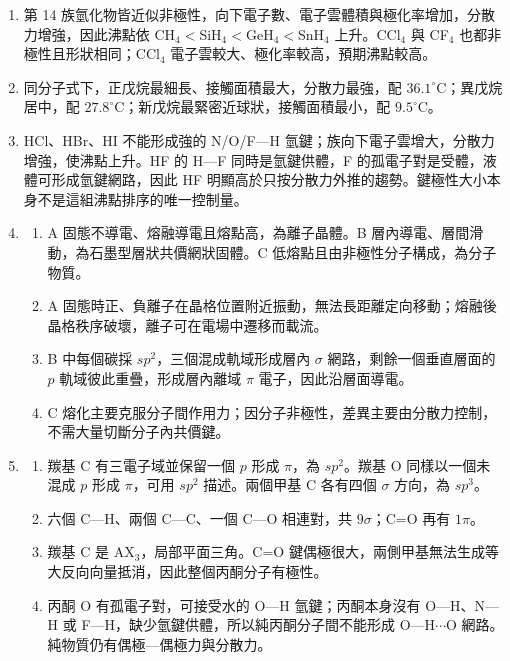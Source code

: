 \documentclass[11pt,a4paper]{article}
\providecommand{\tightlist}{%
  \setlength{\itemsep}{0pt}\setlength{\parskip}{0pt}}
\begin{document}
\begin{enumerate}
  \[
  \mu=\sqrt{(1.20)^2+(1.20)^2}
  =1.20\sqrt2
  =1.70\ \mathrm D.
  \]

  結果小於同向最大值 \(2.40\ \mathrm D\)，大於零，與折線幾何一致。
\item
  第 14 族氫化物皆近似非極性，向下電子數、電子雲體積與極化率增加，分散力增強，因此沸點依 CH\(_4<\)SiH\(_4<\)GeH\(_4<\)SnH\(_4\) 上升。CCl\(_4\) 與 CF\(_4\) 也都非極性且形狀相同；CCl\(_4\) 電子雲較大、極化率較高，預期沸點較高。
\item
  同分子式下，正戊烷最細長、接觸面積最大，分散力最強，配 \(36.1^\circ\mathrm C\)；異戊烷居中，配 \(27.8^\circ\mathrm C\)；新戊烷最緊密近球狀，接觸面積最小，配 \(9.5^\circ\mathrm C\)。
\item
  HCl、HBr、HI 不能形成強的 N/O/F---H 氫鍵；族向下電子雲增大，分散力增強，使沸點上升。HF 的 H---F 同時是氫鍵供體，F 的孤電子對是受體，液體可形成氫鍵網路，因此 HF 明顯高於只按分散力外推的趨勢。鍵極性大小本身不是這組沸點排序的唯一控制量。
\item
  \begin{enumerate}
  \def\labelenumii{\arabic{enumii}.}
  \tightlist
  \item
    A 固態不導電、熔融導電且熔點高，為離子晶體。B 層內導電、層間滑動，為石墨型層狀共價網狀固體。C 低熔點且由非極性分子構成，為分子物質。
  \item
    A 固態時正、負離子在晶格位置附近振動，無法長距離定向移動；熔融後晶格秩序破壞，離子可在電場中遷移而載流。
  \item
    B 中每個碳採 \(sp^2\)，三個混成軌域形成層內 \(\sigma\) 網路，剩餘一個垂直層面的 \(p\) 軌域彼此重疊，形成層內離域 \(\pi\) 電子，因此沿層面導電。
  \item
    C 熔化主要克服分子間作用力；因分子非極性，差異主要由分散力控制，不需大量切斷分子內共價鍵。
  \end{enumerate}
\item
  \begin{enumerate}
  \def\labelenumii{\arabic{enumii}.}
  \tightlist
  \item
    羰基 C 有三電子域並保留一個 \(p\) 形成 \(\pi\)，為 \(sp^2\)。羰基 O 同樣以一個未混成 \(p\) 形成 \(\pi\)，可用 \(sp^2\) 描述。兩個甲基 C 各有四個 \(\sigma\) 方向，為 \(sp^3\)。
  \item
    六個 C---H、兩個 C---C、一個 C---O 相連對，共 \(9\sigma\)；C=O 再有 \(1\pi\)。
  \item
    羰基 C 是 AX\(_3\)，局部平面三角。C=O 鍵偶極很大，兩側甲基無法生成等大反向向量抵消，因此整個丙酮分子有極性。
  \item
    丙酮 O 有孤電子對，可接受水的 O---H 氫鍵；丙酮本身沒有 O---H、N---H 或 F---H，缺少氫鍵供體，所以純丙酮分子間不能形成 O---H\(\cdots\)O 網路。純物質仍有偶極---偶極力與分散力。

\end{enumerate}
\end{enumerate}
\end{document}
